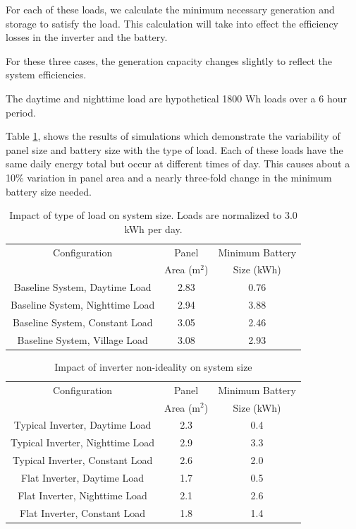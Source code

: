 \documentclass[conference]{IEEEtran}
\begin{document}
For each of these loads, we calculate the minimum necessary generation
and storage to satisfy the load.
This calculation will take into effect the efficiency losses in
the inverter and the battery.

For these three cases, the generation capacity changes slightly
to reflect the system efficiencies.

The daytime and nighttime load are hypothetical 1800 Wh loads over a
6 hour period.

Table \ref{load_type_impact}, shows the results of simulations
which demonstrate the variability of panel size and battery
size with the type of load.
Each of these loads have the same daily energy total but
occur at different times of day.
This causes about a 10\% variation in panel area and a
nearly three-fold change in the minimum battery size needed.

\begin{table}
\centering
\begin{tabular}{c c c}
Configuration & Panel          & Minimum Battery \\
              & Area (m$^2$)   & Size (kWh)      \\
\hline
Baseline System, Daytime Load   & 2.83 & 0.76 \\
Baseline System, Nighttime Load & 2.94 & 3.88 \\
Baseline System, Constant Load  & 3.05 & 2.46 \\
Baseline System, Village Load   & 3.08 & 2.93 \\
\end{tabular}
\caption{Impact of type of load on system size.
Loads are normalized to 3.0 kWh per day.}
\label{load_type_impact}
\end{table}


\begin{table}
\centering
\begin{tabular}{c c c}
Configuration & Panel          & Minimum Battery \\
              & Area (m$^2$)   & Size (kWh)      \\
\hline
Typical Inverter, Daytime Load   & 2.3 & 0.4 \\
Typical Inverter, Nighttime Load & 2.9 & 3.3 \\
Typical Inverter, Constant Load  & 2.6 & 2.0 \\
Flat Inverter, Daytime Load      & 1.7 & 0.5 \\
Flat Inverter, Nighttime Load    & 2.1 & 2.6 \\
Flat Inverter, Constant Load     & 1.8 & 1.4 \\
\end{tabular}
\caption{Impact of inverter non-ideality on system size}
\label{sizetable}
\end{table}
\end{document}
